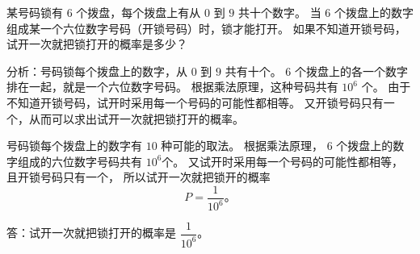 \liti 某号码锁有 $6$ 个拨盘，每个拨盘上有从 $0$ 到 $9$ 共十个数字。
当 $6$ 个拨盘上的数字组成某一个六位数字号码（开锁号码）时，锁才能打开。
如果不知道开锁号码，试开一次就把锁打开的概率是多少？

分析：号码锁每个拨盘上的数字，从 $0$ 到 $9$ 共有十个。
$6$ 个拨盘上的各一个数字排在一起，就是一个六位数字号码。
根据乘法原理，这种号码共有 $10^6$ 个。
由于不知道开锁号码，试开时采用每一个号码的可能性都相等。
又开锁号码只有一个，从而可以求出试开一次就把锁打开的概率。

\jie 号码锁每个拨盘上的数字有 $10$ 种可能的取法。
根据乘法原理， $6$ 个拨盘上的数字组成的六位数字号码共有 $10^6$个。
又试开时采用每一个号码的可能性都相等，且开锁号码只有一个，
所以试开一次就把锁开的概率
$$ P = \dfrac{1}{10^6} \text{。} $$

答：试开一次就把锁打开的概率是 $\dfrac{1}{10^6}$。



\lianxi
\begin{xiaotis}




\end{xiaotis}

